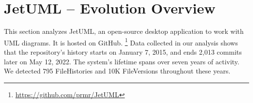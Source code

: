 
\section{JetUML – Evolution Overview}
This section analyzes JetUML, an open-source desktop application to work with UML diagrams. It is hosted on GitHub. \footnote{\url{https://github.com/prmr/JetUML}} Data collected in our analysis shows that the repository's history starts on January 7, 2015, and ends 2,013 commits later on May 12, 2022. The system's lifetime spans over seven years of activity. We detected 795 FileHistories and 10K FileVersions throughout these years.

